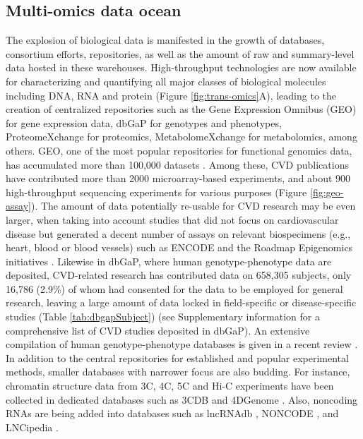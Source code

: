 \documentclass[letter]{bib}
\begin{document}
	\subsection*{Multi-omics data ocean}
    The explosion of biological data is manifested in the growth of databases, consortium efforts, repositories, as well as the amount of raw and summary-level data hosted in these warehouses. High-throughput technologies are now available for characterizing and quantifying all major classes of biological molecules including DNA, RNA and protein (Figure \ref{fig:trans-omics}A), leading to the creation of centralized repositories such as the Gene Expression Omnibus (GEO) \citep{Barrett:2013:NCBI} for gene expression data, dbGaP \citep{Tryka:2014:dbGaP} for genotypes and phenotypes, ProteomeXchange \citep{Vizcaino:2014:ProteomeXchange,Deutsch:2017:ProteomeXchange} for proteomics, MetabolomeXchange for metabolomics, among others.  GEO, one of the most popular repositories for functional genomics data, has accumulated more than 100,000 datasets \citep{Zhu:2008:GEOmetadb}. Among these, CVD publications have contributed more than 2000 microarray-based experiments, and about 900 high-throughput sequencing experiments for various purposes (Figure \ref{fig:geo-assay}). The amount of data potentially re-usable for CVD research may be even larger, when taking into account studies that did not focus on cardiovascular disease but generated a decent number of assays on relevant biospecimens (e.g., heart, blood or blood vessels) such as ENCODE \citep{ENCODE:2012:integrated} and the Roadmap Epigenomics initiatives \citep{Roadmap:2015:Integrative}.
	Likewise in dbGaP, where human genotype-phenotype data are deposited, CVD-related research has contributed data on 658,305 subjects, only 16,786 (2.9\%) of whom had consented for the data to be employed for general research, leaving a large amount of data locked in field-specific or disease-specific studies (Table \ref{tab:dbgapSubject}) (see Supplementary information for a comprehensive list of CVD studies deposited in dbGaP). An extensive compilation of human genotype-phenotype databases is given in a recent review \citep{Brookes:2015:Human}. 
	In addition to the central repositories for established and popular experimental methods, smaller databases with narrower focus are also budding. For instance, chromatin structure data from 3C, 4C, 5C and Hi-C experiments have been collected in dedicated databases such as 3CDB \citep{Yun:2016:3CDB} and 4DGenome \citep{Teng:2015:4DGenome}. Also, noncoding RNAs are being added into databases such as lncRNAdb \citep{Quek:2015:lncRNAdb}, NONCODE \citep{Fang:2018:NONCODEV5}, and LNCipedia \citep{Volders:2018:LNCipedia}.
	
\end{document}
